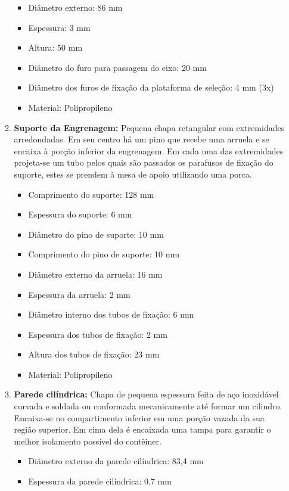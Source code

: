 \begin{enumerate}
\begin{enumerate}
    \begin{itemize}
       \item Diâmetro externo: 86 mm
        \item Espessura: 3 mm
        \item Altura: 50 mm
        \item Diâmetro do furo para passagem do eixo: 20 mm
        \item Diâmetro dos furos de fixação da plataforma de seleção: 4 mm (3x)
         \item Material: Polipropileno
\end{itemize}
    \item \textbf{Suporte da Engrenagem:} Pequena chapa retangular com extremidades arredondadas. Em seu centro há um pino que recebe uma arruela e se encaixa à porção inferior da engrenagem. Em cada uma das extremidades projeta-se um tubo pelos quais são passados os parafusos de fixação do suporte, estes se prendem à mesa de apoio utilizando uma porca.
    \begin{itemize}
        \item Comprimento do suporte: 128 mm
        \item Espessura do suporte: 6 mm
        \item Diâmetro do pino de suporte: 10 mm
        \item Comprimento do pino de suporte: 10 mm
        \item Diâmetro externo da arruela: 16 mm
        \item Espessura da arruela: 2 mm
        \item Diâmetro interno dos tubos de fixação: 6 mm
        \item Espessura dos tubos de fixação: 2 mm
        \item Altura dos tubos de fixação: 23 mm
         \item Material: Polipropileno
    \end{itemize}
    \item \textbf{Parede cilíndrica:} Chapa de pequena espessura feita de aço inoxidável curvada e soldada ou conformada mecanicamente até formar um cilindro. Encaixa-se no compartimento inferior em uma porção vazada da sua região superior. Em cima dela é encaixada uma tampa para garantir o melhor isolamento possível do contêiner.
    \begin{itemize}
        \item Diâmetro externo da parede cilíndrica: 83,4 mm
        \item Espessura da parede cilíndrica: 0,7 mm

\end{itemize}
\end{enumerate}
\end{enumerate}
